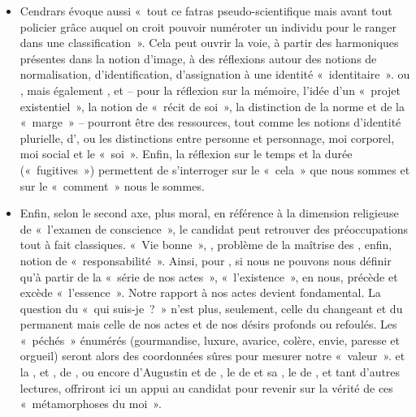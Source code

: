 {\begin{itemize}
\item Cendrars évoque aussi «~tout ce fatras pseudo-scientifique mais avant tout policier
grâce auquel on croit pouvoir numéroter un individu pour le ranger dans une
classification~». Cela peut ouvrir la voie, à partir des harmoniques présentes dans la
notion d'image, à des réflexions autour des notions de normalisation, d'identification,
d'assignation à une identité «~identitaire~».  ou , mais également
,  et  – pour la réflexion sur la mémoire, l'idée d'un «~projet existentiel~», la notion de «~récit de soi~», la distinction de la norme et de la «~marge~»
– pourront être des ressources, tout comme les notions d'identité plurielle, d', ou les distinctions entre personne et personnage, moi corporel, moi social et
le «~soi~». Enfin, la réflexion sur le temps et la durée («~fugitives~») permettent de
s'interroger sur le «~cela~» que nous sommes et sur le «~comment~» nous le sommes.
\item Enfin, selon le second axe, plus moral, en référence à la dimension religieuse de
«~l'examen de conscience~», le candidat peut retrouver des préoccupations tout à fait
classiques. «~Vie bonne~», , problème de la maîtrise des , enfin, notion de «~responsabilité~». Ainsi, pour , si nous ne pouvons nous
définir qu'à partir de la «~série de nos actes~», «~l'existence~», en nous, précède et
excède «~l'essence~». Notre rapport à nos actes devient fondamental. La question du
«~qui suis-je~?~» n'est plus, seulement, celle du changeant et du permanent mais celle
de nos actes et de nos désirs profonds ou refoulés. Les «~péchés~» énumérés
(gourmandise, luxure, avarice, colère, envie, paresse et orgueil) seront alors des
coordonnées sûres pour mesurer notre «~valeur~».  et la ,  et ,  de , ou encore  d'Augustin et de , le  de  et sa  , le  de , et tant d'autres lectures, offriront ici
un appui au candidat pour revenir sur la vérité de ces «~métamorphoses du moi~».
\end{itemize}}

